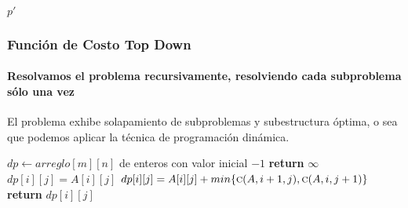 \documentclass[spanish]{beamer}
\begin{document}
\begin{frame}
\begin{minipage}[t][8em][t]{\textwidth}
\begin{center}
{                    $p'$
                }
            \end{center}
        \end{minipage}
    \end{frame}

    \begin{frame}
        \frametitle{Función de Costo Top Down}
        \framesubtitle{Resolvamos el problema recursivamente, resolviendo cada subproblema sólo una vez}

        El problema exhibe solapamiento de subproblemas y subestructura óptima, o sea que podemos aplicar la técnica de programación dinámica.

        \vspace{1em}

        \begin{algorithmic}
            \State $dp \leftarrow arreglo[m][n]$ de enteros con valor inicial $-1$
                 
                    \State \textbf{return} $\infty$
                \EndIf
                 
                     
                        \State $dp[i][j] = A[i][j]$
                    \Else {}
                        \State $dp[i][j] = A[i][j] + min\{ \textsc{c}(A, i + 1, j), \textsc{c}(A, i, j + 1) \}$
                    \EndIf
                \EndIf
                \State \textbf{return} $dp[i][j]$
            \EndProcedure
        \end{algorithmic}
    \end{frame}
\end{document}
